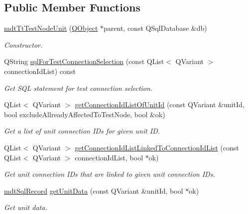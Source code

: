\subsection*{Public Member Functions}
\begin{DoxyCompactItemize}
\item 
\hyperlink{classmdt_tt_test_node_unit_a835947279a78b98325db60aebfb8a04d}{mdt\-Tt\-Test\-Node\-Unit} (\hyperlink{class_q_object}{Q\-Object} $\ast$parent, const Q\-Sql\-Database \&db)
\begin{DoxyCompactList}\small\item\em Constructor. \end{DoxyCompactList}\item 
Q\-String \hyperlink{classmdt_tt_test_node_unit_a18f34b24834aa9b51b7ae328d2358e17}{sql\-For\-Test\-Connection\-Selection} (const Q\-List$<$ Q\-Variant $>$ connection\-Id\-List) const 
\begin{DoxyCompactList}\small\item\em Get S\-Q\-L statement for test connection selection. \end{DoxyCompactList}\item 
Q\-List$<$ Q\-Variant $>$ \hyperlink{classmdt_tt_test_node_unit_a4430727b510df4c6b3bb6ea78074d555}{get\-Connection\-Id\-List\-Of\-Unit\-Id} (const Q\-Variant \&unit\-Id, bool exclude\-Allready\-Affected\-To\-Test\-Node, bool \&ok)
\begin{DoxyCompactList}\small\item\em Get a list of unit connection I\-Ds for given unit I\-D. \end{DoxyCompactList}\item 
Q\-List$<$ Q\-Variant $>$ \hyperlink{classmdt_tt_test_node_unit_a6625a34706221c627ce2b7ca8b3a3b20}{get\-Connection\-Id\-List\-Linked\-To\-Connection\-Id\-List} (const Q\-List$<$ Q\-Variant $>$ connection\-Id\-List, bool $\ast$ok)
\begin{DoxyCompactList}\small\item\em Get unit connection I\-Ds that are linked to given unit connection I\-Ds. \end{DoxyCompactList}\item 
\hyperlink{classmdt_sql_record}{mdt\-Sql\-Record} \hyperlink{classmdt_tt_test_node_unit_a62037b84333f04180d790942de24a927}{get\-Unit\-Data} (const Q\-Variant \&unit\-Id, bool $\ast$ok)
\begin{DoxyCompactList}\small\item\em Get unit data. \end{DoxyCompactList}\item 

\end{DoxyCompactItemize}

